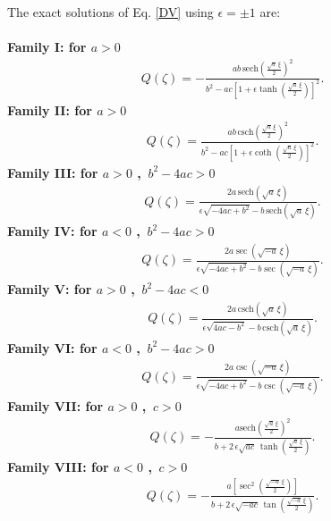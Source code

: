 \documentclass{article}
\numberwithin{equation}{section}
\begin{document}
The exact solutions of Eq. \ref{DV} using ${\epsilon=\pm1}$ are:\\\\
\textbf{Family I: for $a > 0$ }
\begin{eqnarray}\label{F1}
Q \! \left(\zeta \right) = -\frac{a b\,\mathrm{sech}\! \left(\frac{\sqrt{a}\, \xi}{2}\right)^{2}}{b^{2}-a c \left[1+\epsilon  \tanh \! \left(\frac{\sqrt{a}\, \xi}{2}\right)\right]^{2}}.
\end{eqnarray}
\textbf{Family II: for $a > 0$ }
\begin{eqnarray}\label{F2}
Q \! \left(\zeta \right) = \frac{a b\,\mathrm{csch}\! \left(\frac{\sqrt{a}\, \xi}{2}\right)^{2}}{b^{2}-a c \left[1+\epsilon  \coth \! \left(\frac{\sqrt{a}\, \xi}{2}\right)\right]^{2}}.
\end{eqnarray}
\textbf{Family III: for $a > 0$ , \,$b^{2}-4ac > 0$ }
\begin{eqnarray}\label{F3}
Q \! \left(\zeta \right) =\frac{2 a \,\mathrm{sech}\! \left(\sqrt{a}\, \xi \right)}{\epsilon  \sqrt{-4 a c +b^{2}}-b \,\mathrm{sech}\! \left(\sqrt{a}\, \xi \right)}.
\end{eqnarray}
\textbf{Family IV: for $a < 0$ , \,$b^{2}-4ac > 0$ }
\begin{eqnarray}\label{F4}
Q \! \left(\zeta \right) =\frac{2 a \sec \! \left(\sqrt{-a}\, \xi \right)}{\epsilon  \sqrt{-4 a c +b^{2}}-b \sec \! \left(\sqrt{-a}\, \xi \right)}.
\end{eqnarray}
\textbf{Family V: for $a > 0$ , \,$b^{2}-4ac < 0$ }
\begin{eqnarray}\label{F5}
Q \! \left(\zeta \right) =\frac{2 a \,\mathrm{csch}\! \left(\sqrt{a}\, \xi \right)}{\epsilon  \sqrt{4 a c -b^{2}}-b \,\mathrm{csch}\! \left(\sqrt{a}\, \xi \right)}.
\end{eqnarray}
\textbf{Family VI: for $a < 0$ , \,$b^{2}-4ac > 0$ }
\begin{eqnarray}\label{F6}
Q \! \left(\zeta \right) =\frac{2 a \csc \! \left(\sqrt{-a}\, \xi \right)}{\epsilon  \sqrt{-4 a c +b^{2}}-b \csc \! \left(\sqrt{-a}\, \xi \right)}.
\end{eqnarray}
\textbf{Family VII: for $a > 0$ , \,$c > 0$ }
\begin{eqnarray}\label{F7}
Q \! \left(\zeta \right) =-\frac{a \mathrm{sech}\! \left(\frac{\sqrt{a}\, \xi}{2}\right)^{2}}{b +2\,\epsilon  \sqrt{a c}\, \tanh \! \left(\frac{\sqrt{a}\, \xi}{2}\right)}.
\end{eqnarray}
\textbf{Family VIII: for $a < 0$ , \,$c > 0$ }
\begin{eqnarray}\label{F8}
Q \! \left(\zeta \right) =-\frac{a \left[\sec^{2}\left(\frac{\sqrt{-a}\, \xi}{2}\right)\right]}{b +2\,\epsilon  \sqrt{-a c}\, \tan \! \left(\frac{\sqrt{-a}\, \xi}{2}\right)}.
\end{eqnarray}
\end{document}
